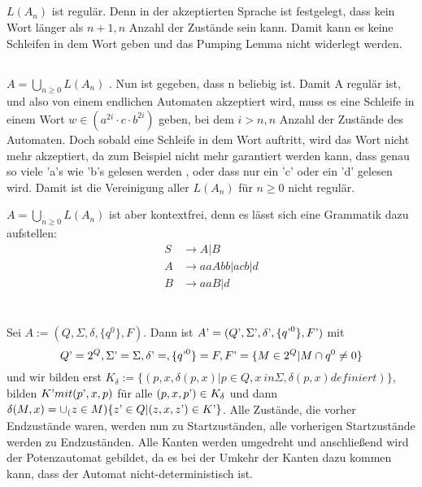 \documentclass{article}
\begin{document}
\subsection{}

$L(A_n)$ ist regulär. Denn in der akzeptierten Sprache ist
festgelegt, dass kein Wort länger als $n + 1, n$ Anzahl der Zustände
sein kann. Damit kann es keine Schleifen in dem Wort geben und das
Pumping Lemma nicht widerlegt werden.

 \subsection{}
 
 $A = \bigcup_{n \geq 0} L(A_n)$ . Nun ist gegeben, dass n beliebig
ist. Damit A regulär ist, und also von einem endlichen Automaten
akzeptiert wird, muss es eine Schleife in einem Wort $w \in
(a^{2i}\cdot c\cdot b^{2i})$ geben, bei dem $i > n, n$ Anzahl der
Zustände des Automaten. Doch sobald eine Schleife in dem Wort auftritt, 
wird das Wort nicht mehr akzeptiert, da zum Beispiel nicht mehr garantiert werden kann, dass genau so viele 'a's wie 'b's gelesen werden , oder dass nur ein 'c' oder ein 'd' gelesen wird. Damit ist die Vereinigung aller $L(A_n)$ für $n \geq 0$ nicht regulär. 

 $A = \bigcup_{n \geq 0} L(A_n)$ ist aber kontextfrei, denn es lässt sich eine Grammatik dazu aufstellen:
\begin{align*}
 S &\rightarrow A | B \\
 A &\rightarrow aaAbb | acb | d \\
 B &\rightarrow aaB | d 
\end{align*}
 
\section{}
\subsection{}

Sei $A := (Q, \Sigma, \delta, \{q^0\}, F)$. 
Dann ist $ A\textrm' = (Q\textrm', \Sigma\textrm', 
\delta\textrm', \{q\textrm'^0\},F\textrm')
$ mit \[ Q\textrm' = 2^Q, \Sigma\textrm' = \Sigma, 
\delta\textrm' = , \{q\textrm'^0\}= F,  F\textrm' = \{M \in 2^Q | M \cap q^0 \neq 0\} \] und wir bilden erst
$K_\delta := \{ (p,x, \delta(p,x)| p \in Q, x \ in \Sigma, \delta(p,x) definiert)\}$,
bilden $K\textrm' mit (p\textrm',x,p)$ für alle $(p,x,p\textrm') \in K_\delta$ und dann
$\delta(M,x)= \cup_(z\in M) \{z\textrm' \in Q | (z,x,z\textrm') \in K\textrm'\}$.
Alle Zustände, die vorher Endzustände waren, werden nun zu Startzuständen, alle vorherigen Startzustände werden
zu Endzuständen. Alle Kanten werden umgedreht und anschließend wird der Potenzautomat gebildet, da es bei der
Umkehr der Kanten dazu kommen kann, dass der Automat nicht-deterministisch ist. 
  
\end{document}

